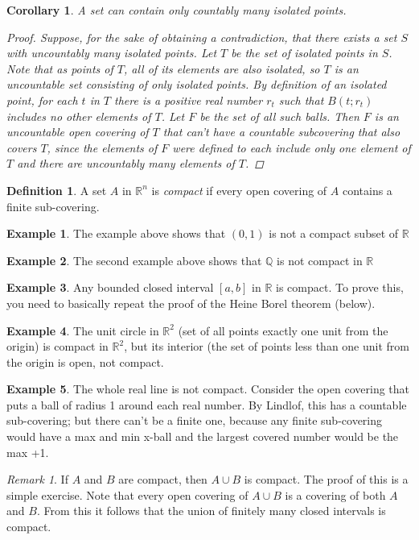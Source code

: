 \documentclass[11pt,a4paper]{report}
\theoremstyle{plain}
\newtheorem*{cor}{Corollary}
\theoremstyle{definition}
\newtheorem{defn}{Definition}[section]
\newtheorem{exmp}{Example}[section]
\theoremstyle{remark}
\newtheorem*{rem}{Remark}
\begin{document}
\begin{cor}
A set can contain only countably many isolated points.
\begin{proof}
Suppose, for the sake of obtaining a contradiction, that there exists a set $S$ with uncountably many isolated points.  Let $T$ be the set of isolated points in $S$. Note that as points of $T$, all of its elements are also isolated, so $T$ is an uncountable set consisting of only isolated points. By definition of an isolated point, for each $t$ in $T$ there is a positive real number $r_t$ such that $B(t;r_t)$ includes no other elements of $T$. Let $F$ be the set of all such balls.  Then $F$ is an uncountable open covering of $T$ that can't have a countable subcovering that also covers $T$, since the elements of $F$ were defined to each include only one element of $T$ and there are uncountably many elements of $T$.
\end{proof}
\end{cor}
\begin{defn}
A set $A$ in $\mathbb{R}^n$ is \textit{compact} if every open covering of $A$ contains a finite sub-covering.
\end{defn}
\begin{exmp}
The example above shows that $(0,1)$ is not a compact subset of $\mathbb{R}$
\end{exmp}
\begin{exmp}
The second example above shows that $\mathbb{Q}$ is not compact in $\mathbb{R}$
\end{exmp}
\begin{exmp}
Any bounded closed interval $[a,b]$ in $\mathbb{R}$ is compact.  To prove this, you need to basically repeat the proof of the Heine Borel theorem (below).
\end{exmp}
\begin{exmp}
The unit circle in $\mathbb{R}^2$ (set of all points exactly one unit from the origin) is compact in $\mathbb{R}^2$, but its interior (the set of points less than one unit from the origin is open, not compact.
\end{exmp}
\begin{exmp}
The whole real line is not compact.  Consider the open covering that puts a ball of radius 1 around each real number.  By Lindlof, this has a countable sub-covering; but there can't be a finite one, because any finite sub-covering would have a max and min x-ball and the largest covered number would be the max +1.
\end{exmp}
\begin{rem}
If $A$ and $B$ are compact, then $A \cup B$ is compact.  The proof of this is a simple exercise.  Note that every open covering of $A \cup B$ is a covering of both $A$ and $B$.  From this it follows that the union of finitely many closed intervals is compact.
\end{rem}
\end{document}
